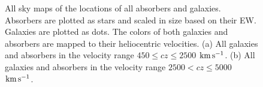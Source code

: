 \documentclass[twocolumn,tighten]{aastex62}
\newcommand{\kms}{$\rm km\, s^{-1}$}
\begin{document}
\begin{figure}[ht!]
\centering
  \label{allsky_2500}
  \label{allsky_5000}
  \caption{\small{All sky maps of the locations of all absorbers and galaxies. Absorbers are plotted as stars and scaled in size based on their EW. Galaxies are plotted as dots. The colors of both galaxies and absorbers are mapped to their heliocentric velocities. (a) All galaxies and absorbers in the velocity range $450 \leq cz \leq 2500$ \kms. (b) All galaxies and absorbers in the velocity range $2500 < cz \leq 5000$ \kms.}}
\vspace{0pt}
\label{allsky_2500-5000}
\end{figure}
\end{document}
